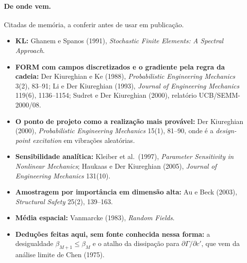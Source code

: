 \paragraph{De onde vem.} Citadas de memória, a conferir antes de usar em publicação.
\begin{itemize}
  \item \textbf{KL:} Ghanem e Spanos (1991), \emph{Stochastic Finite Elements: A Spectral Approach}.
  \item \textbf{FORM com campos discretizados e o gradiente pela regra da cadeia:} Der Kiureghian e Ke (1988),
    \emph{Probabilistic Engineering Mechanics} 3(2), 83--91; Li e Der Kiureghian (1993), \emph{Journal of Engineering
    Mechanics} 119(6), 1136--1154; Sudret e Der Kiureghian (2000), relatório UCB/SEMM-2000/08.
  \item \textbf{O ponto de projeto como a realização mais provável:} Der Kiureghian (2000), \emph{Probabilistic
    Engineering Mechanics} 15(1), 81--90, onde é a \emph{design-point excitation} em vibrações aleatórias.
  \item \textbf{Sensibilidade analítica:} Kleiber et al.\ (1997), \emph{Parameter Sensitivity in Nonlinear Mechanics};
    Haukaas e Der Kiureghian (2005), \emph{Journal of Engineering Mechanics} 131(10).
  \item \textbf{Amostragem por importância em dimensão alta:} Au e Beck (2003), \emph{Structural Safety} 25(2),
    139--163.
  \item \textbf{Média espacial:} Vanmarcke (1983), \emph{Random Fields}.
  \item \textbf{Deduções feitas aqui, sem fonte conhecida nessa forma:} a desigualdade $\beta_{M+1} \leq \beta_M$ e o
    atalho da dissipação para $\partial\Gamma/\partial c'$, que vem da análise limite de Chen (1975).
\end{itemize}
